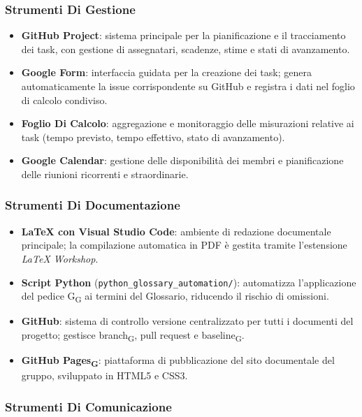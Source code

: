 \subsubsection{Strumenti Di Gestione}
 
\begin{itemize}
  \item \textbf{GitHub Project}: sistema principale per la
        pianificazione e il tracciamento dei task, con gestione
        di assegnatari, scadenze, stime e stati di avanzamento.
  \item \textbf{Google Form}: interfaccia guidata per la creazione dei task;
        genera automaticamente la issue corrispondente su GitHub
        e registra i dati nel foglio di calcolo condiviso.
  \item \textbf{Foglio Di Calcolo}: aggregazione e monitoraggio delle misurazioni
        relative ai task (tempo previsto, tempo effettivo, stato di avanzamento).
  \item \textbf{Google Calendar}: gestione delle disponibilità
        dei membri e pianificazione delle riunioni ricorrenti e straordinarie.
\end{itemize}
 
\subsubsection{Strumenti Di Documentazione}
 
\begin{itemize}
  \item \textbf{\LaTeX{} con Visual Studio Code}: ambiente di redazione documentale
        principale; la compilazione automatica in PDF è gestita tramite l'estensione
        \textit{LaTeX Workshop}.
  \item \textbf{Script Python} (\texttt{python\_glossary\_automation/}):
        automatizza l'applicazione del pedice G\textsubscript{G} ai termini del
        Glossario, riducendo il rischio di omissioni.
  \item \textbf{GitHub}: sistema di controllo versione centralizzato per tutti i
        documenti del progetto; gestisce branch\textsubscript{G}, pull
        request e baseline\textsubscript{G}.
  \item \textbf{GitHub Pages\textsubscript{G}}: piattaforma di pubblicazione del
        sito documentale del gruppo, sviluppato in HTML5 e CSS3.
\end{itemize}
 
\subsubsection{Strumenti Di Comunicazione}
 
